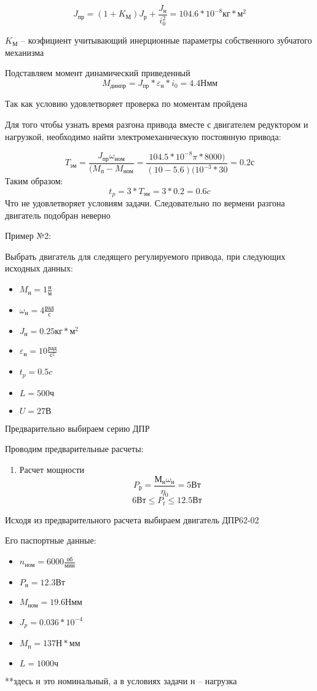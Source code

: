\documentclass{article}
\begin{document}
$$
J_{пр} = (1 + K_М)J_р + \frac{J_н}{i_0^2} = 104.6 * 10^{-8} кг * м^2
$$

$K_М$ -- коэфициент учитывающий инерционные параметры собственного зубчатого механизма

Подставляем момент динамический приведенный
$$
M_{дин пр} = J_{пр} * \varepsilon_н * i_0 = 4.4 Нмм
$$

Так как условию %
удовлетворяет проверка по моментам пройдена

Для того чтобы узнать время разгона привода вместе с двигателем редуктором и нагрузкой, необходимо найти электромеханическую постоянную привода:

$$
T_{эм} = \frac{J_{пр} \omega_{ном}}{(M_{п} - M_{ном}} = \frac{104.5 * 10^{-8} \pi * 8000)}{(10 -5.6) (10^{-3} * 30} = 0.2 с
$$
Таким образом:
$$
t_p = 3 * T_{эм} = 3 * 0.2 = 0.6 c
$$
Что не удовлетворяет условиям задачи. Следовательно по вермени разгона двигатель подобран неверно

Пример №2:

Выбрать двигатель для следящего регулируемого привода, при следующих исходных данных:
\begin{itemize}
	\item $M_н = 1 \frac{н}{м} $
	\item $\omega_н = 4 \frac{рад}{с}$
	\item $J_н = 0.25 кг * м^2$
	\item $\varepsilon_н = 10 \frac{рад}{с^2} $
	\item $t_p = 0.5 c$
	\item $L = 500 ч$
	\item $U = 27 В$
\end{itemize}
Предварительно выбираем серию ДПР

Проводим предварительные расчеты:
\begin{enumerate}
	\item Расчет мощности
	$$
	P_р = \frac{М_н \omega_н}{\eta_0} = 5 Вт 
	$$
	$$
	6 Вт \le P_t \le 12.5 Вт
	$$
\end{enumerate}
Исходя из предварительного расчета выбираем двигатель ДПР62-02

Его паспортные данные:
\begin{itemize}
	\item $n_{ном} = 6000 \frac{об}{мин} $
	\item $P_н = 12.3 Вт$
	\item $M_{ном} = 19.6 Н мм$
	\item $J_p = 0.036 * 10^{-4}$
	\item $M_п = 137 Н * мм$
	\item $L = 1000 ч$
\end{itemize}
**здесь н это номинальный, а в условиях задачи н -- нагрузка
\end{document}
